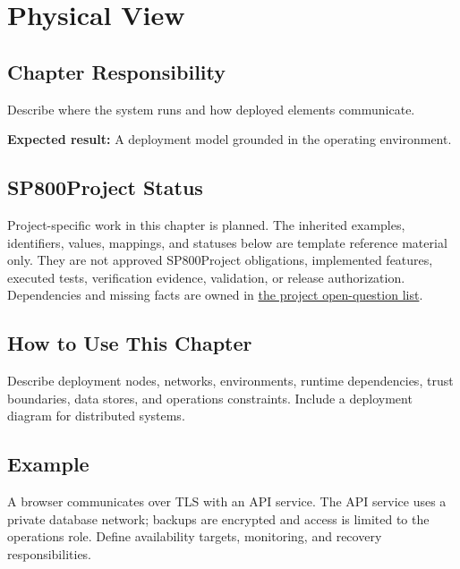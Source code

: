 \chapter{Physical View}
\section{Chapter Responsibility}
\label{Section:PhysicalViewResponsibility}
Describe where the system runs and how deployed elements communicate.

\noindent\textbf{Expected result:} A deployment model grounded in the operating environment.

\section{SP800Project Status}
\label{Section:SP800StatusPhysicalView}
Project-specific work in this chapter is planned. The inherited examples,
identifiers, values, mappings, and statuses below are template reference
material only. They are not approved SP800Project obligations, implemented features,
executed tests, verification evidence, validation, or release authorization.
Dependencies and missing facts are owned in
\hyperref[Section:SP800OpenQuestions]{the project open-question list}.

\section{How to Use This Chapter}
Describe deployment nodes, networks, environments, runtime dependencies, trust boundaries, data stores, and operations constraints. Include a deployment diagram for distributed systems.
\section{Example}
A browser communicates over TLS with an API service. The API service uses a private database network; backups are encrypted and access is limited to the operations role. Define availability targets, monitoring, and recovery responsibilities.

